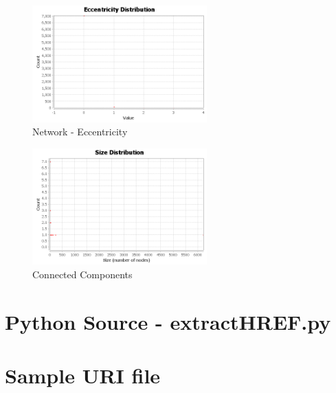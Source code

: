 \documentclass[letterpaper,11pt]{report}
\begin{document}
\begin{savenotes}
\begin{figure}[htbp]
	\centering
		\includegraphics[width=0.60\textwidth]{EccentricityDistribution.png}
	\caption{Network - Eccentricity}
	\label{fig:Eccentricity Distribution}
\end{figure}



\begin{figure}[htbp]
	\centering
		\includegraphics[width=0.60\textwidth]{cc-size-distribution.png}
	\caption{Connected Components}
	\label{fig:cc-size-distribution}
\end{figure}


\end{savenotes}




\appendix
{}

\chapter{Python Source - extractHREF.py} \label{chap:extractHREF}

\chapter{Sample URI file} \label{chap:file1}

\end{document}
